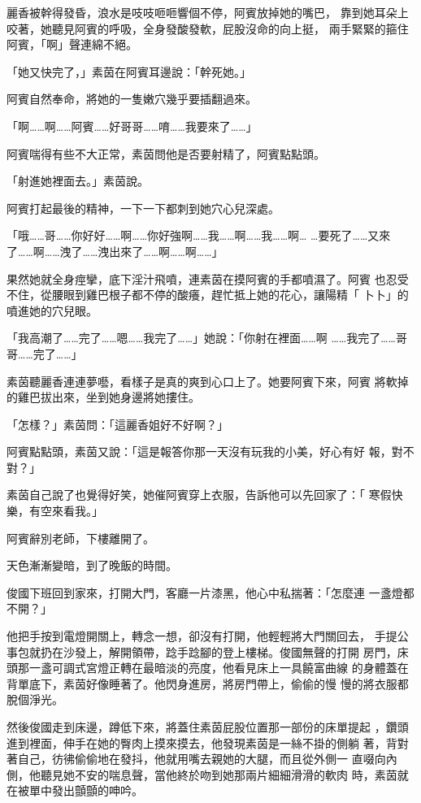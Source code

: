 麗香被幹得發昏，浪水是吱吱咂咂響個不停，阿賓放掉她的嘴巴，
靠到她耳朵上咬著，她聽見阿賓的呼吸，全身發酸發軟，屁股沒命的向上挺，
兩手緊緊的箍住阿賓，「啊」聲連綿不絕。

「她又快完了，」素茵在阿賓耳邊說：「幹死她。」

阿賓自然奉命，將她的一隻嫩穴幾乎要插翻過來。

「啊……啊……阿賓……好哥哥……唷……我要來了……」

阿賓喘得有些不大正常，素茵問他是否要射精了，阿賓點點頭。

「射進她裡面去。」素茵說。

阿賓打起最後的精神，一下一下都刺到她穴心兒深處。

「哦……哥……你好好……啊……你好強啊……我……啊……我……啊…
…要死了……又來了……啊……洩了……洩出來了……啊……啊……」

果然她就全身痙攣，底下淫汁飛噴，連素茵在摸阿賓的手都噴濕了。阿賓
也忍受不住，從腰眼到雞巴根子都不停的酸癢，趕忙抵上她的花心，讓陽精「
卜卜」的噴進她的穴兒眼。

「我高潮了……完了……嗯……我完了……」她說：「你射在裡面……啊
……我完了……哥哥……完了……」

素茵聽麗香連連夢囈，看樣子是真的爽到心口上了。她要阿賓下來，阿賓
將軟掉的雞巴拔出來，坐到她身邊將她摟住。

「怎樣？」素茵問：「這麗香姐好不好啊？」

阿賓點點頭，素茵又說：「這是報答你那一天沒有玩我的小美，好心有好
報，對不對？」

素茵自己說了也覺得好笑，她催阿賓穿上衣服，告訴他可以先回家了：「
寒假快樂，有空來看我。」

阿賓辭別老師，下樓離開了。

天色漸漸變暗，到了晚飯的時間。

俊國下班回到家來，打開大門，客廳一片漆黑，他心中私揣著：「怎麼連
一盞燈都不開？」

他把手按到電燈開關上，轉念一想，卻沒有打開，他輕輕將大門關回去，
手提公事包就扔在沙發上，解開領帶，踗手踗腳的登上樓梯。俊國無聲的打開
房門，床頭那一盞可調式宮燈正轉在最暗淡的亮度，他看見床上一具饒富曲線
的身體蓋在背單底下，素茵好像睡著了。他閃身進房，將房門帶上，偷偷的慢
慢的將衣服都脫個淨光。

然後俊國走到床邊，蹲低下來，將蓋住素茵屁股位置那一部份的床單提起
，鑽頭進到裡面，伸手在她的臀肉上摸來摸去，他發現素茵是一絲不掛的側躺
著，背對著自己，彷彿偷偷地在發抖，他就用嘴去親她的大腿，而且從外側一
直啜向內側，他聽見她不安的喘息聲，當他終於吻到她那兩片細細滑滑的軟肉
時，素茵就在被單中發出顫顫的呻吟。

